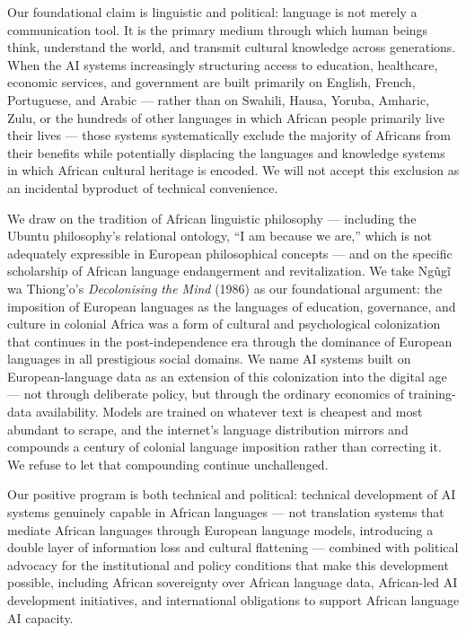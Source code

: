 Our foundational claim is linguistic and political: language is not
merely a communication tool. It is the primary medium through which
human beings think, understand the world, and transmit cultural
knowledge across generations. When the AI systems increasingly
structuring access to education, healthcare, economic services, and
government are built primarily on English, French, Portuguese, and
Arabic --- rather than on Swahili, Hausa, Yoruba, Amharic, Zulu, or the
hundreds of other languages in which African people primarily live their
lives --- those systems systematically exclude the majority of Africans
from their benefits while potentially displacing the languages and
knowledge systems in which African cultural heritage is encoded. We will
not accept this exclusion as an incidental byproduct of technical
convenience.

We draw on the tradition of African linguistic philosophy --- including
the Ubuntu philosophy's relational ontology, ``I am because we are,''
which is not adequately expressible in European philosophical concepts
--- and on the specific scholarship of African language endangerment and
revitalization. We take Ngũgĩ wa Thiong'o's \emph{Decolonising the Mind}
(1986) as our foundational argument: the imposition of European
languages as the languages of education, governance, and culture in
colonial Africa was a form of cultural and psychological colonization
that continues in the post-independence era through the dominance of
European languages in all prestigious social domains. We name AI systems
built on European-language data as an extension of this colonization
into the digital age --- not through deliberate policy, but through the
ordinary economics of training-data availability. Models are trained on
whatever text is cheapest and most abundant to scrape, and the
internet's language distribution mirrors and compounds a century of
colonial language imposition rather than correcting it. We refuse to let
that compounding continue unchallenged.

Our positive program is both technical and political: technical
development of AI systems genuinely capable in African languages --- not
translation systems that mediate African languages through European
language models, introducing a double layer of information loss and
cultural flattening --- combined with political advocacy for the
institutional and policy conditions that make this development possible,
including African sovereignty over African language data, African-led AI
development initiatives, and international obligations to support
African language AI capacity.

